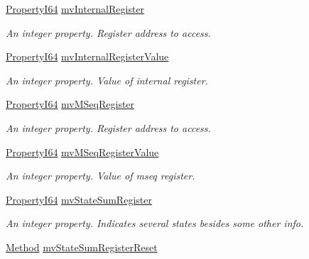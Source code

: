 \begin{DoxyCompactItemize}
\hyperlink{group___common_interface_ga81749b2696755513663492664a18a893}{Property\+I64} \hyperlink{classmv_i_m_p_a_c_t_1_1acquire_1_1_gen_i_cam_1_1mv_custom_data_a911a21eaf40c5d6ac9a75ee76ee656cd}{mv\+Internal\+Register}
\begin{DoxyCompactList}\small\item\em An integer property. Register address to access. \end{DoxyCompactList}\item 
\hyperlink{group___common_interface_ga81749b2696755513663492664a18a893}{Property\+I64} \hyperlink{classmv_i_m_p_a_c_t_1_1acquire_1_1_gen_i_cam_1_1mv_custom_data_a97a8294ef7df7b7083cf2dadbb014c58}{mv\+Internal\+Register\+Value}
\begin{DoxyCompactList}\small\item\em An integer property. Value of internal register. \end{DoxyCompactList}\item 
\hyperlink{group___common_interface_ga81749b2696755513663492664a18a893}{Property\+I64} \hyperlink{classmv_i_m_p_a_c_t_1_1acquire_1_1_gen_i_cam_1_1mv_custom_data_a3f8c2b5e7e584c8f6556b018913c1f54}{mv\+M\+Seq\+Register}
\begin{DoxyCompactList}\small\item\em An integer property. Register address to access. \end{DoxyCompactList}\item 
\hyperlink{group___common_interface_ga81749b2696755513663492664a18a893}{Property\+I64} \hyperlink{classmv_i_m_p_a_c_t_1_1acquire_1_1_gen_i_cam_1_1mv_custom_data_ad4eba7288f3da02003cfa49d1f0c1ee8}{mv\+M\+Seq\+Register\+Value}
\begin{DoxyCompactList}\small\item\em An integer property. Value of mseq register. \end{DoxyCompactList}\item 
\hyperlink{group___common_interface_ga81749b2696755513663492664a18a893}{Property\+I64} \hyperlink{classmv_i_m_p_a_c_t_1_1acquire_1_1_gen_i_cam_1_1mv_custom_data_a030ac8a90b5a71623de369e90b4998d0}{mv\+State\+Sum\+Register}
\begin{DoxyCompactList}\small\item\em An integer property. Indicates several states besides some other info. \end{DoxyCompactList}\item 
\hyperlink{classmv_i_m_p_a_c_t_1_1acquire_1_1_method}{Method} \hyperlink{classmv_i_m_p_a_c_t_1_1acquire_1_1_gen_i_cam_1_1mv_custom_data_adfb429f6bfc05ef62966ea0288e0eed4}{mv\+State\+Sum\+Register\+Reset}

\end{DoxyCompactItemize}
